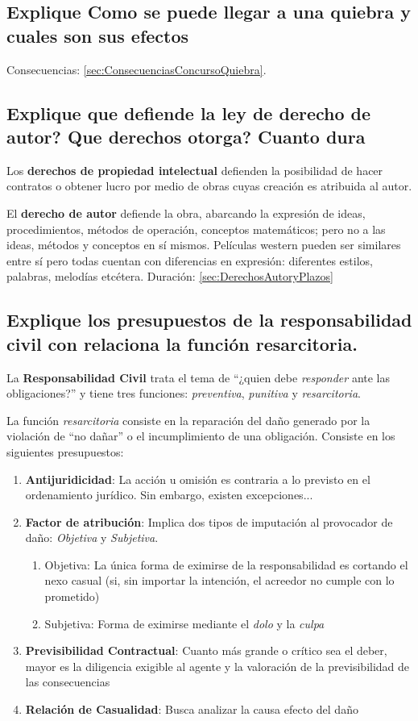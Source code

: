 \documentclass{article}
\begin{document}
\subsection{Explique Como se puede llegar a una quiebra y cuales son sus efectos}
Consecuencias: \ref{sec:ConsecuenciasConcursoQuiebra}.
\subsection{Explique que defiende la ley de derecho de autor? Que derechos otorga? Cuanto dura}
	Los \textbf{derechos de propiedad intelectual} defienden la posibilidad de hacer contratos o obtener lucro por medio de obras cuyas creación es atribuida al autor.
    
	El \textbf{derecho de autor} defiende la obra, abarcando la expresión de ideas, procedimientos, métodos de operación, conceptos matemáticos; pero no a las ideas, métodos y conceptos en sí mismos.
	Películas western pueden ser similares entre sí pero todas cuentan con diferencias en expresión: diferentes estilos, palabras, melodías etcétera.
	Duración: \ref{sec:DerechosAutoryPlazos}

\subsection{Explique los presupuestos de la responsabilidad civil con relaciona la función resarcitoria.}
\label{sec:ResponsabilidadCivilyFuncionResarcitoria}
La \textbf{Responsabilidad Civil} trata el tema de ``¿quien debe \textit{responder} ante las obligaciones?'' y tiene tres funciones: \textit{preventiva}, \textit{punitiva} y \textit{resarcitoria}. 

La función \textit{resarcitoria} consiste en la reparación del daño generado por la violación de ``no dañar'' o el incumplimiento de una obligación. Consiste en los siguientes presupuestos:

\begin{enumerate}
    \item \textbf{Antijuridicidad}: La acción u omisión es contraria a lo previsto en el ordenamiento jurídico. Sin embargo, existen excepciones...
    \item \textbf{Factor de atribución}: Implica dos tipos de imputación al provocador de daño: \textit{Objetiva} y \textit{Subjetiva}.
    \begin{enumerate}
        \item Objetiva: La única forma de eximirse de la responsabilidad es cortando el nexo casual (si, sin importar la intención, el acreedor no cumple con lo prometido)
        \item Subjetiva: Forma de eximirse mediante el \textit{dolo} y la \textit{culpa}
    \end{enumerate}
    \item \textbf{Previsibilidad Contractual}: Cuanto más grande o crítico sea el deber, mayor es la diligencia exigible al agente y la valoración de la previsibilidad de las consecuencias
    \item \textbf{Relación de Casualidad}: Busca analizar la causa efecto del daño
\end{enumerate}
\end{document}
